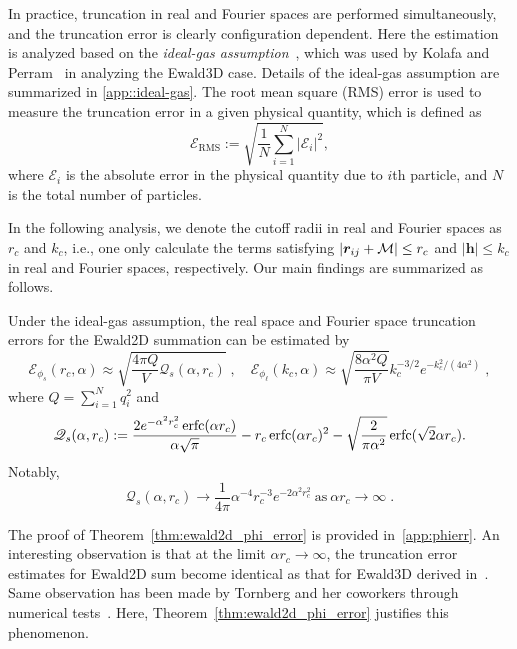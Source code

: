 In practice, truncation in real and Fourier spaces are performed simultaneously, and the truncation error is clearly configuration dependent.
Here the estimation is analyzed based on the \emph{ideal-gas assumption}~\cite{hansen2013theory}, which was used by Kolafa and Perram~\cite{kolafa1992cutoff} in analyzing the Ewald3D case. 
Details of the ideal-gas assumption are summarized in \ref{app::ideal-gas}.
The root mean square (RMS) error is used to measure the truncation error in a given physical quantity, which is defined as
\begin{equation}\label{RMS}
	\mathscr{E}_{\text{RMS}} := \sqrt{\frac{1}{N}\sum_{i=1}^{N}\left|\mathscr{E}_i\right|^2},
\end{equation}
where $\mathscr{E}_i$ is the absolute error in the physical quantity due to $i$th particle, and $N$ is the total number of particles.

In the following analysis, we denote the cutoff radii in real and Fourier spaces as $r_c$ and $k_c$, i.e., one only calculate the terms satisfying $\lvert\bm{r}_{ij} + \mathcal{M}\rvert \leq r_c$ and 
$|\bm{h }|\leq k_c$ in real and Fourier spaces, respectively.
Our main findings are summarized as follows. 

\begin{thm}\label{thm:ewald2d_phi_error}
	Under the ideal-gas assumption, the real space and Fourier space truncation errors for the Ewald2D summation can be estimated by
	\begin{equation}\label{eq::Ephi}
		\mathscr{E}_{\phi_s} (r_c, \alpha) \approx \sqrt{\frac{4\pi Q}{V}\mathscr{Q}_{s}(\alpha,r_c)}\;, \quad
		\mathscr{E}_{\phi_\ell} (k_c, \alpha) \approx \sqrt{\frac{8\alpha^2Q}{\pi V}}k_c^{-3/2}e^{-k_c^2/(4\alpha^2)}\;,
	\end{equation}
	where $Q = \sum_{i=1}^{N} q_{i}^2$ and
	\begin{equation}\label{eq::Qs2}
		\mathscr{Q}_{s}(\alpha,r_c):=\frac{2e^{-\alpha^2r_c^2}\operatorname{erfc}(\alpha r_c)}{\alpha\sqrt{\pi}}-r_c\operatorname{erfc}(\alpha r_c)^2-\sqrt{\frac{2}{\pi\alpha^2}}\operatorname{erfc}(\sqrt{2}\alpha r_c).
	\end{equation}
	Notably,
	\begin{equation}\label{eq::Qs}
		\mathscr{Q}_{s}(\alpha,r_c)\rightarrow\frac{1}{4\pi}\alpha^{-4} r_c^{-3}e^{-2\alpha^2r_c^2}~\text{as}~\alpha r_c\rightarrow \infty\;. 
	\end{equation}
\end{thm}
The proof of Theorem~\ref{thm:ewald2d_phi_error} is provided in~\ref{app:phierr}.
An interesting observation is that at the limit $\alpha r_c\rightarrow \infty$, the truncation error estimates for Ewald2D sum become identical as that for Ewald3D derived in~\cite{kolafa1992cutoff}.
Same observation has been made by Tornberg and her coworkers through numerical tests~\cite{lindbo2012fast,shamshirgar2021fast}. 
Here, Theorem~\ref{thm:ewald2d_phi_error} justifies this phenomenon.

